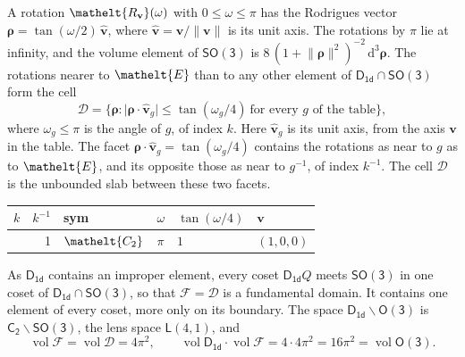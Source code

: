 \documentclass[10pt,a4paper]{article}
\numberwithin{equation}{section}
\newcommand{\eltfont}[1]{{\let\sigma\eltsigma\mathelt{#1}}}
\newcommand{\grp}[1]{\mathsf{#1}}
\newcommand{\cls}[1]{\eltfont{#1}}
\newcommand{\elt}[1]{\eltfont{#1}}
\newcommand{\dirvec}[3]{(#1, #2, #3)}
\newcommand{\unitaxis}{\hat{\mathbf{v}}}
\newcommand{\vv}{\mathbf{v}}
\newcommand{\diff}{\mathrm{d}}
\newcommand{\vol}{\operatorname{vol}}
\newcommand{\rodrigues}{\boldsymbol{\rho}}
\newcommand{\fcell}{\mathcal{D}}
\newcommand{\fdomain}{\mathcal{F}}
\newcommand{\lensspace}[2]{\mathsf{L}(#1, #2)}
\begin{document}
\leavevmode\label{n:vector.rodrigues}\label{n:vector.unitaxis}A rotation $\elt{R_{\vv}}(\omega)$ with $0 \le \omega \le \pi$ has the Rodrigues vector $\rodrigues = \tan(\omega/2)\,\unitaxis$, where $\unitaxis = \vv/\lVert\vv\rVert$ is its unit axis. The rotations by $\pi$ lie at infinity, and the volume element of \href{SO3.pdf}{$\grp{SO(3)}$} is $8\,(1 + \lVert\rodrigues\rVert^2)^{-2}\,\diff^3\rodrigues$.
\leavevmode\label{n:set.cell}The rotations nearer to $\elt{E}$ than to any other element of $\grp{D_{1d}} \cap \grp{SO(3)}$ form the cell
\begin{equation}\label{e:cell}\fcell = \bigl\{\rodrigues : \lvert\rodrigues\cdot\unitaxis_g\rvert \le \tan(\omega_g/4)\ \text{for every $g$ of the table}\bigr\},\end{equation}
where $\omega_g \le \pi$ is the angle of $g$, of index $k$. Here $\unitaxis_g$ is its unit axis, from the axis $\vv$ in the table. The facet $\rodrigues\cdot\unitaxis_g = \tan(\omega_g/4)$ contains the rotations as near to $g$ as to $\elt{E}$, and its opposite those as near to $g^{-1}$, of index $k^{-1}$. The cell $\fcell$ is the unbounded slab between these two facets.
{\small\begin{longtable}{@{}rrllll@{}}\toprule
$k$ & $k^{-1}$ & sym & $\omega$ & $\tan(\omega/4)$ & $\vv$\\\midrule\endhead
\bottomrule\endfoot\endlastfoot
1 & 1 & $\cls{C_{2}}$ & $\pi$ & $1$ & $\dirvec{1}{0}{0}$\\
\bottomrule\end{longtable}}

\leavevmode\label{n:set.fundamental}As $\grp{D_{1d}}$ contains an improper element, every coset $\grp{D_{1d}}Q$ meets \href{SO3.pdf}{$\grp{SO(3)}$} in one coset of $\grp{D_{1d}} \cap \grp{SO(3)}$, so that $\fdomain = \fcell$ is a fundamental domain. It contains one element of every coset, more only on its boundary.
\leavevmode\label{n:set.lens}The space $\grp{D_{1d}}\backslash\grp{O(3)}$ is $\grp{C_{2}}\backslash\grp{SO(3)}$, the lens space $\lensspace{4}{1}$, and
\begin{equation}\label{e:volume}\vol\fdomain = \vol\fcell = 4\pi^2,\qquad \vol\grp{D_{1d}}\cdot\vol\fdomain = 4\cdot 4\pi^2 = 16\pi^2 = \vol\grp{O(3)}.\end{equation}
\end{document}
